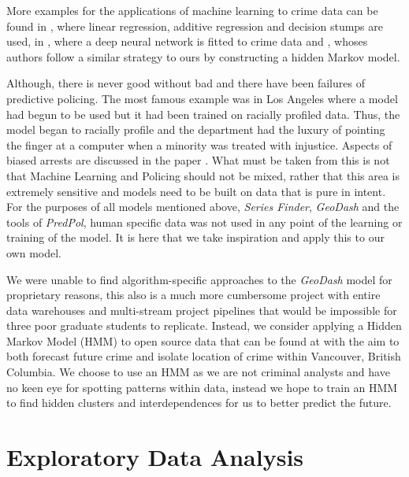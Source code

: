 \documentclass{article}
\begin{document}
More examples for the applications of machine learning to crime data can be found 
in \cite{mcclendon2015using}, where linear regression, additive regression and decision stumps are used,
in \cite{kang2017prediction}, where a deep neural network is fitted to crime data 
and \cite{hidden}, whoses authors follow a similar strategy to ours by constructing a hidden Markov model.


Although, there is never good without bad and there have been failures of predictive policing. The most famous example was in Los Angeles where a model had begun to be used but it had been trained on racially profiled data. Thus, the model began to racially profile and the department had the luxury of pointing the finger at a computer when a minority was treated with injustice. Aspects of biased arrests are discussed in the paper \cite{racism}. What must be taken from this is not that Machine Learning and Policing should not be mixed, rather that this area is extremely sensitive and models need to be built on data that is pure in intent. For the purposes of all models mentioned above, \textit{Series Finder}, \textit{GeoDash} and the tools of \textit{PredPol}, human specific data was not used in any point of the learning or training of the model. It is here that we take inspiration and apply this to our own model.

We were unable to find algorithm-specific approaches to the \textit{GeoDash} model for proprietary reasons, this also is a much more cumbersome project with entire data warehouses and multi-stream project pipelines that would be impossible for three poor graduate students to replicate. Instead, we consider applying a Hidden Markov Model (HMM) to open source data that can be found at \cite{Dataset} with the aim to both forecast future crime and isolate location of crime within Vancouver, British Columbia. We choose to use an HMM as we are not criminal analysts and have no keen eye for spotting patterns within data, instead we hope to train an HMM to find hidden clusters and interdependences for us to better predict the future. 

\section{Exploratory Data Analysis}
\label{sec:stats}
\end{document}
